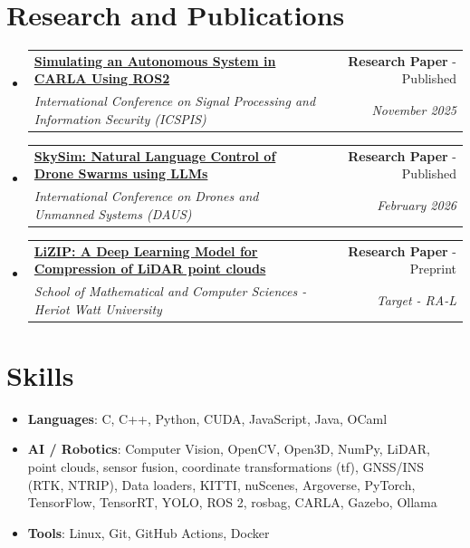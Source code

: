 \documentclass[a4paper,20pt]{article}
\makeatletter
\newcommand{\resumeItem}[2] {
	\item\small{
		\textbf{#1}{: #2 \vspace{-2pt}}
	}
}
\newcommand{\resumeSubheading}[4] {
	\vspace{-1pt}\item
	\begin{tabular*}{0.97\textwidth}{l@{\extracolsep{\fill}}r}
		\textbf{#1} & #2 \\
		\textit{#3} & \textit{#4} \\
	\end{tabular*}\vspace{-5pt}
}
\newcommand{\resumeSubItem}[2]{\resumeItem{#1}{#2}\vspace{-3pt}}
\newcommand{\resumeSubHeadingListStart}{\begin{itemize}[leftmargin=*]}
\newcommand{\resumeSubHeadingListEnd}{\end{itemize}}
\makeatother
\begin{document}
\section{Research and Publications}
	\resumeSubHeadingListStart
        \resumeSubheading
		{\href{https://ieeexplore.ieee.org/document/11318365}{Simulating an Autonomous System in CARLA Using ROS2}}
		{\textbf{Research Paper} - Published} 
		{International Conference on Signal Processing and Information Security (ICSPIS)}{November 2025}
		\resumeSubheading
		{\href{https://sensorsportal.com/DOWNLOADS/DAUS_2026_Proceedings.pdf}{SkySim: Natural Language Control of Drone Swarms using LLMs}}
		{\textbf{Research Paper} - Published} 
		{International Conference on Drones and Unmanned Systems (DAUS)}{February 2026}
		\resumeSubheading
		{\href{https://arxiv.org/abs/2603.23162}{LiZIP: A Deep Learning Model for Compression of LiDAR point clouds}}
		{\textbf{Research Paper} - Preprint} 
		{School of Mathematical and Computer Sciences - Heriot Watt University}{Target - RA-L}
	\resumeSubHeadingListEnd

\vspace{1pt}

\section{Skills}
    \resumeSubHeadingListStart
        \resumeSubItem{Languages}{C, C++, Python, CUDA, JavaScript, Java, OCaml}
        \resumeSubItem{AI / Robotics}{Computer Vision, OpenCV, Open3D, NumPy, LiDAR, point clouds, sensor fusion, coordinate transformations (tf), GNSS/INS (RTK, NTRIP), Data loaders, KITTI, nuScenes, Argoverse, PyTorch, TensorFlow, TensorRT, YOLO, ROS 2, rosbag, CARLA, Gazebo, Ollama}
        \resumeSubItem{Tools}{Linux, Git, GitHub Actions, Docker}
    \resumeSubHeadingListEnd
\end{document}
